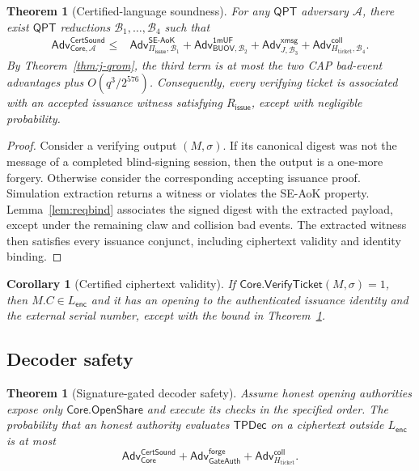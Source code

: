 \documentclass[11pt]{article}
\newtheorem{theorem}[definition]{Theorem}
\newtheorem{corollary}[definition]{Corollary}
\newcommand{\Core}{\mathsf{Core}}
\newcommand{\BUOV}{\mathsf{BUOV}}
\newcommand{\Piiss}{\Pi_{\mathsf{issue}}}
\newcommand{\TPDec}{\mathsf{TPDec}}
\newcommand{\Adv}{\mathsf{Adv}}
\newcommand{\QPT}{\mathsf{QPT}}
\begin{document}
\begin{theorem}[Certified-language soundness]\label{thm:certsound}
For any $\QPT$ adversary $\mathcal A$, there exist $\QPT$ reductions
$\mathcal B_1,\ldots,\mathcal B_4$ such that
\begin{align*}
 \Adv^{\mathsf{CertSound}}_{\Core,\mathcal A}
 \leq{}&
 \Adv^{\mathsf{SE\text{-}AoK}}_{\Piiss,\mathcal B_1}
 +\Adv^{\mathsf{1mUF}}_{\BUOV,\mathcal B_2}
 +\Adv^{\mathsf{xmsg}}_{J,\mathcal B_3}
 +\Adv^{\mathsf{coll}}_{H_{\mathrm{ticket}},\mathcal B_4}.
\end{align*}
By Theorem~\ref{thm:j-qrom}, the third term is at most the two CAP bad-event
advantages plus $O(q^3/2^{576})$.
Consequently, every verifying ticket is associated with an accepted issuance
witness satisfying $R_{\mathsf{issue}}$, except with negligible probability.
\end{theorem}

\begin{proof}
Consider a verifying output $(M,\sigma)$.  If its canonical digest was not the
message of a completed blind-signing session, then the output is a one-more
forgery.  Otherwise consider the corresponding accepting issuance proof.
Simulation extraction returns a witness or violates the SE-AoK property.
Lemma~\ref{lem:reqbind} associates the signed digest with the extracted payload,
except under the remaining claw and collision bad events.  The extracted witness
then satisfies every issuance conjunct, including ciphertext validity and
identity binding.
\end{proof}

\begin{corollary}[Certified ciphertext validity]\label{cor:validct}
If $\Core.\mathsf{VerifyTicket}(M,\sigma)=1$, then $M.C\in
L_{\mathsf{enc}}$ and it has an opening to the authenticated issuance identity
and the external serial number, except with the bound in
Theorem~\ref{thm:certsound}.
\end{corollary}

\subsection{Decoder safety}

\begin{theorem}[Signature-gated decoder safety]\label{thm:safety}
Assume honest opening authorities expose only
$\Core.\mathsf{OpenShare}$ and execute its checks in the specified order.  The
probability that an honest authority evaluates $\TPDec$ on a ciphertext outside
$L_{\mathsf{enc}}$ is at most
\[
 \Adv^{\mathsf{CertSound}}_{\Core}+\Adv^{\mathsf{forge}}_{\mathsf{GateAuth}}
 +\Adv^{\mathsf{coll}}_{H_{\mathrm{ticket}}}.
\]
\end{theorem}
\end{document}
